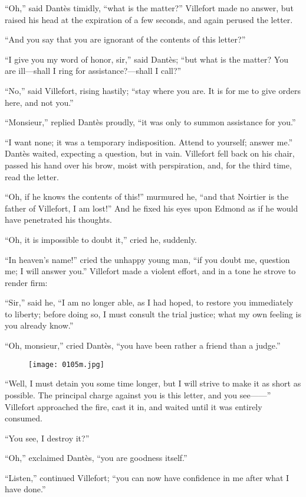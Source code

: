 “Oh,” said Dantès timidly, “what is the matter?” Villefort made no
answer, but raised his head at the expiration of a few seconds, and
again perused the letter.

“And you say that you are ignorant of the contents of this letter?”

“I give you my word of honor, sir,” said Dantès; “but what is the
matter? You are ill—shall I ring for assistance?—shall I call?”

“No,” said Villefort, rising hastily; “stay where you are. It is for me
to give orders here, and not you.”

“Monsieur,” replied Dantès proudly, “it was only to summon assistance
for you.”

“I want none; it was a temporary indisposition. Attend to yourself;
answer me.” Dantès waited, expecting a question, but in vain. Villefort
fell back on his chair, passed his hand over his brow, moist with
perspiration, and, for the third time, read the letter.

“Oh, if he knows the contents of this!” murmured he, “and that Noirtier
is the father of Villefort, I am lost!” And he fixed his eyes upon
Edmond as if he would have penetrated his thoughts.

“Oh, it is impossible to doubt it,” cried he, suddenly.

“In heaven’s name!” cried the unhappy young man, “if you doubt me,
question me; I will answer you.” Villefort made a violent effort, and
in a tone he strove to render firm:

“Sir,” said he, “I am no longer able, as I had hoped, to restore you
immediately to liberty; before doing so, I must consult the trial
justice; what my own feeling is you already know.”

“Oh, monsieur,” cried Dantès, “you have been rather a friend than a
judge.”

\begin{figure}[h]
\texttt{[image: 0105m.jpg]}
\end{figure}

“Well, I must detain you some time longer, but I will strive to make it
as short as possible. The principal charge against you is this letter,
and you see——” Villefort approached the fire, cast it in, and waited
until it was entirely consumed.

“You see, I destroy it?”

“Oh,” exclaimed Dantès, “you are goodness itself.”

“Listen,” continued Villefort; “you can now have confidence in me after
what I have done.”

